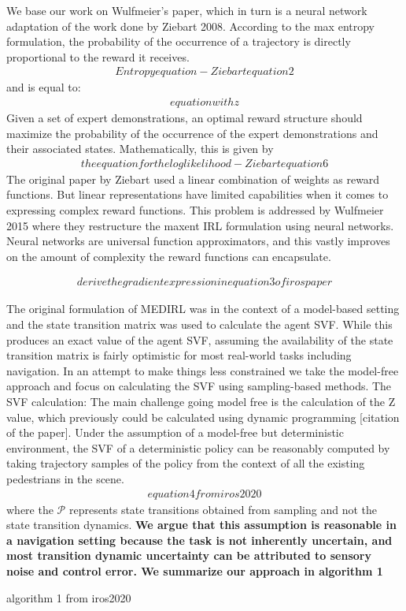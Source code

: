 We base our work on Wulfmeier's paper, which in turn is a neural network adaptation of the work done by Ziebart 2008. 
According to the max entropy formulation, the probability of the occurrence of a trajectory is directly proportional to the reward it receives.
\begin{align}
Entropy equation - Ziebart equation 2
\end{align}
and is equal to:
\begin{align}
equation with z
\end{align}
Given a set of expert demonstrations, an optimal reward structure should maximize the probability of the occurrence of the expert demonstrations and their associated states. Mathematically, this is given by 
\begin{align}
the equation for the loglikelihood-Ziebart equation 6
\end{align}
The original paper by Ziebart used a linear combination of weights as reward functions. But linear representations have limited capabilities when it comes to expressing complex reward functions. This problem is addressed by Wulfmeier 2015 where they restructure the maxent IRL formulation using neural networks. Neural networks are universal function approximators, and this vastly improves on the amount of complexity the reward functions can encapsulate.

\begin{align}
derive the gradient expression in equation 3 of iros paper
\end{align}

The original formulation of MEDIRL was in the context of a model-based setting and the state transition matrix was used to calculate the agent SVF. While this produces an exact value of the agent SVF, assuming the availability of the state transition matrix is fairly optimistic for most real-world tasks including navigation. In an attempt to make things less constrained we take the model-free approach and focus on calculating the SVF using sampling-based methods. 
The SVF calculation:
The main challenge going model free is the calculation of the Z value, which previously could be calculated using dynamic programming [citation of the paper]. 
Under the assumption of a model-free but deterministic environment, the SVF of a deterministic policy can be reasonably computed by taking trajectory samples of the policy from the context of all the existing pedestrians in the scene. 
\begin{align}
equation 4 from iros2020
\end{align}
where the $\mathcal{P}$ represents state transitions obtained from sampling and not the state transition dynamics. \textbf{We argue that this assumption is reasonable in a navigation setting because the task is not inherently uncertain, and most transition dynamic uncertainty can be attributed to sensory noise and control error. We summarize our approach in algorithm 1}
\begin{algorithm}
	algorithm 1 from iros2020
\end{algorithm}

